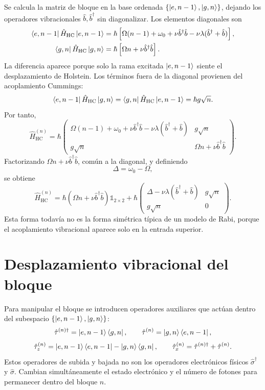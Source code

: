 \documentclass[11pt]{article}
\newcommand{\bdag}{\hat b^\dagger}
\newcommand{\sigmad}{\hat\sigma^\dagger}
\begin{document}
Se calcula la matriz de bloque en la base ordenada
$\{\ket{e,n-1},\ket{g,n}\}$, dejando los operadores vibracionales
$\hat b,\bdag$ sin diagonalizar. Los elementos diagonales son
\begin{align}
  \bra{e,n-1}\hat H_{\mathrm{HC}}\ket{e,n-1}
  &=
  \hbar
  \left[
  \Omega(n-1)+\omega_0+\nu\bdag\hat b
  -
  \nu\lambda(\bdag+\hat b)
  \right],
  \\
  \bra{g,n}\hat H_{\mathrm{HC}}\ket{g,n}
  &=
  \hbar\left[
  \Omega n+\nu\bdag\hat b
  \right].
\end{align}
La diferencia aparece porque solo la rama excitada $\ket{e,n-1}$ siente el
desplazamiento de Holstein. Los t\'erminos fuera de la diagonal provienen del
acoplamiento Cummings:
\begin{equation}
  \bra{e,n-1}\hat H_{\mathrm{HC}}\ket{g,n}
  =
  \bra{g,n}\hat H_{\mathrm{HC}}\ket{e,n-1}
  =
  \hbar g\sqrt n.
\end{equation}
Por tanto,
\begin{equation}
  \hat H_{\mathrm{HC}}^{(n)}
  =
  \hbar
  \begin{pmatrix}
  \Omega(n-1)+\omega_0+\nu\bdag\hat b-\nu\lambda(\bdag+\hat b)
  &
  g\sqrt n\\
  g\sqrt n
  &
  \Omega n+\nu\bdag\hat b
  \end{pmatrix}.
\end{equation}
Factorizando $\Omega n+\nu\bdag\hat b$, com\'un a la diagonal, y definiendo
\begin{equation}
  \Delta=\omega_0-\Omega,
\end{equation}
se obtiene
\begin{equation}
  \boxed{
  \hat H_{\mathrm{HC}}^{(n)}
  =
  \hbar\left(\Omega n+\nu\bdag\hat b\right)\mathds{1}_{2\times2}
  +
  \hbar
  \begin{pmatrix}
  \Delta-\nu\lambda(\bdag+\hat b) & g\sqrt n\\
  g\sqrt n & 0
  \end{pmatrix}.
  }
\end{equation}
Esta forma todav\'ia no es la forma sim\'etrica t\'ipica de un modelo de Rabi,
porque el acoplamiento vibracional aparece solo en la entrada superior.

\section{Desplazamiento vibracional del bloque}

Para manipular el bloque se introducen operadores auxiliares que act\'uan
dentro del subespacio $\{\ket{e,n-1},\ket{g,n}\}$:
\begin{equation}
  \hat\tau^{(n)\dagger}=\ket{e,n-1}\bra{g,n},
  \qquad
  \hat\tau^{(n)}=\ket{g,n}\bra{e,n-1},
\end{equation}
\begin{equation}
  \hat\tau_z^{(n)}
  =
  \ket{e,n-1}\bra{e,n-1}
  -
  \ket{g,n}\bra{g,n},
  \qquad
  \hat\tau_x^{(n)}
  =
  \hat\tau^{(n)\dagger}+\hat\tau^{(n)}.
\end{equation}
Estos operadores de subida y bajada no son los operadores electr\'onicos
f\'isicos $\sigmad$ y $\hat\sigma$. Cambian simult\'aneamente el estado
electr\'onico y el n\'umero de fotones para permanecer dentro del bloque $n$.
\end{document}
